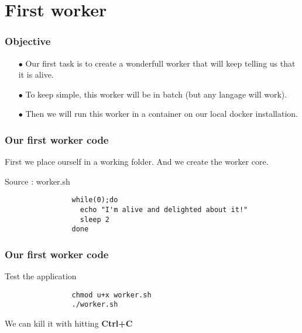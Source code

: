 \section{First worker}
	
	\begin{frame}
		\frametitle{Objective}
		
		\begin{itemize}
			\item[$\bullet$] Our first task is to create a wonderfull worker that will keep telling us that it is alive.
			\item[$\bullet$] To keep simple, this worker will be in batch (but any langage will work).	
			\item[$\bullet$] Then we will run this worker in a container on our local docker installation.
		\end{itemize}
		
	\end{frame}		
	
	\begin{frame}[fragile]
		\frametitle{Our first worker code}

		First we place ourself in a working folder. And we create the worker core.
		
		\begin{block}{Source : worker.sh}
			\begin{verbatim}
				while(0);do
				  echo "I'm alive and delighted about it!"
				  sleep 2
				done
			\end{verbatim}
		\end{block}
		
	\end{frame}

	\begin{frame}[fragile]
		\frametitle{Our first worker code}
		
		\begin{block}{Test the application}
			\begin{verbatim}
				chmod u+x worker.sh
				./worker.sh
			\end{verbatim}
		\end{block}
		We can kill it with hitting \textbf{Ctrl+C}
		
	\end{frame}